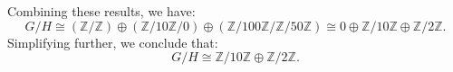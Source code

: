 \documentclass{article}
\def\zz{{\mathbb Z}}
\begin{document}
\begin{enumerate}[(a)]
        Combining these results, we have:
        \[
            G/H \cong (\zz / \zz) \oplus (\zz/10\zz / 0) \oplus (\zz/100\zz / \zz/50\zz) \cong 0 \oplus \zz/10\zz \oplus \zz/2\zz.
        \]
        Simplifying further, we conclude that:
        \[
            G/H \cong \zz/10\zz \oplus \zz/2\zz.
        \]
    
    

\end{enumerate}
\end{document}
